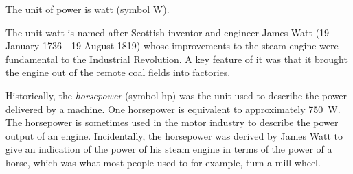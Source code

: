 The unit of power is watt (symbol W).


\begin{IFact}
{The unit watt is named after Scottish inventor and engineer James Watt (19 January 1736 - 19 August 1819) whose improvements to the steam engine were fundamental to the Industrial Revolution. A key feature of it was that it brought the engine out of the remote coal fields into factories.}
\end{IFact}


\begin{IFact}
{Historically, the \textit{horsepower} (symbol hp) was the unit used to describe the power delivered by a machine. One horsepower is equivalent to approximately 750~W. The horsepower is sometimes used in the motor industry to describe the power output of an engine. Incidentally, the horsepower was derived by James Watt to give an indication of the power of his steam engine in terms of the power of a horse, which was what most people used to for example, turn a mill wheel.}
\end{IFact}

